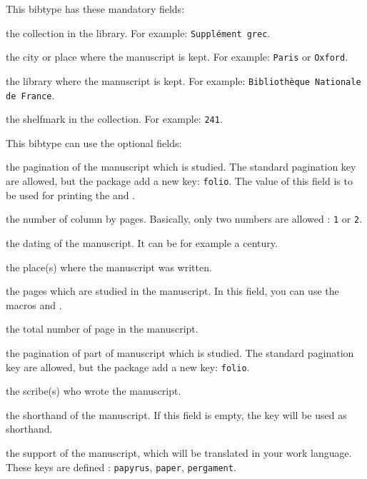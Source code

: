 \documentclass{ltxdockit}[2011/03/25]
\begin{document}
This bibtype has these mandatory fields:

\begin{fieldlist}

 the collection in the library. For example: \verb+Supplément grec+.

 the city or place where the manuscript is kept. For example: \verb+Paris+ or \verb+Oxford+. 

 the library where the manuscript is kept. For example: \verb+Bibliothèque Nationale de France+.


 the shelfmark in the collection. For example: \verb+241+.
\end{fieldlist}

This bibtype can use the optional fields:

\begin{fieldlist}

 the pagination of the manuscript which is studied. The standard pagination key are allowed, but the package add a new key: \texttt{folio}. The value of this field is to be used for printing the  and .

 the number of column by pages. Basically, only two numbers are allowed : \verb+1+ or \verb+2+.

 the dating of the manuscript. It can be for example a century.

 the place(s) where the manuscript was written.

 the pages which are studied in the manuscript. In this field, you can use the macros  and .

 the total number of page in the manuscript.


 the pagination of part of manuscript which is studied. The standard pagination key are allowed, but the package add a new key: \verb+folio+.

 the scribe(s) who wrote the manuscript.

 the shorthand of the manuscript. If this field is empty, the key will be used as shorthand.

 the support of the manuscript, which will be translated in your work language. These keys are defined : \texttt{papyrus}, \texttt{paper}, \texttt{pergament}.

\end{fieldlist}
\end{document}
